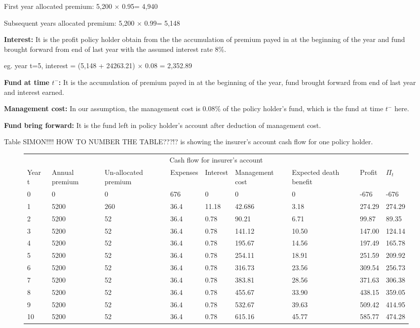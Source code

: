 \documentclass{report}
\begin{document}
First year allocated premium:                5,200 $\times$ 0.95= 4,940

Subsequent years allocated premium:   5,200 $\times$ 0.99= 5,148

\textbf{Interest:} It is the profit policy holder obtain from the the accumulation of premium payed in at the beginning of the year and fund brought forward from end of last year with the assumed interest rate 8\%.

eg.  year t=5, interest = (5,148 + 24263.21) $\times$ 0.08 = 2,352.89

\textbf{Fund at time $t^-$:} It is the accumulation of premium payed in at the beginning of the year, fund brought forward from end of last year and interest earned.

\textbf{Management cost:} In our assumption, the management cost is 0.08\% of the policy holder's fund, which is the fund at time $t^-$ here. 

\textbf{Fund bring forward:} It is the fund left in policy holder's account after deduction of management cost. 


Table SIMON!!!! HOW TO NUMBER THE TABLE???!? is showing the insurer's account cash flow for one policy holder. 


\begin{figure}[ht]
\hfill
\begin{tabular}{p{0.8cm} p{1.5cm} p{1.5cm} p{1.2cm} p{1cm} p{2cm}p{1.5cm} p{1.5cm} p{1.5cm} }
\toprule
\multicolumn{9}{c}{Cash flow for insurer's account} \\
\cmidrule(r){3-7}

Year t & Annual premium & Un-allocated premium & Expenses & Interest &Management cost& Expected death benefit & Profit& $\Pi_t$  \\
\midrule

0&0&0&676&0&0&0&-676&-676\\
1&5200&260&36.4&11.18&42.686&3.18&274.29&274.29\\
2&5200&52&36.4&0.78&90.21&6.71&99.87&89.35\\
3&5200&52&36.4&0.78&141.12&10.50&147.00&124.14\\
4&5200&52&36.4&0.78&195.67&14.56&197.49&165.78\\
5&5200&52&36.4&0.78&254.11&18.91&251.59&209.92\\
6&5200&52&36.4&0.78&316.73&23.56&309.54&256.73\\
7&5200&52&36.4&0.78&383.81&28.56&371.63&306.38\\
8&5200&52&36.4&0.78&455.67&33.90&438.15&359.05\\
9&5200&52&36.4&0.78&532.67&39.63&509.42&414.95\\
10&5200&52&36.4&0.78&615.16&45.77&585.77&474.28\\

\bottomrule
\end{tabular}
\end{figure}
\end{document}

